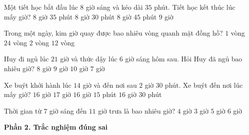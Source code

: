 \begin{ex} %
Một tiết học bắt đầu lúc $8$ giờ sáng và kéo dài $35$ phút. Tiết học kết thúc lúc mấy giờ?
\choice
{\True $8$ giờ $35$ phút}
{$8$ giờ $30$ phút}
{$8$ giờ $45$ phút}
{$9$ giờ}
\end{ex}

\begin{ex} %
Trong một ngày, kim giờ quay được bao nhiêu vòng quanh mặt đồng hồ?
\choice
{$1$ vòng}
{$24$ vòng}
{\True $2$ vòng}
{$12$ vòng}
\end{ex}

\begin{ex} %
Huy đi ngủ lúc $21$ giờ và thức dậy lúc $6$ giờ sáng hôm sau. Hỏi Huy đã ngủ bao nhiêu giờ?
\choice
{$8$ giờ}
{\True $9$ giờ}
{$10$ giờ}
{$7$ giờ}
\end{ex}

\begin{ex} %
Xe buýt khởi hành lúc $14$ giờ và đến nơi sau $2$ giờ $30$ phút. Xe buýt đến nơi lúc mấy giờ?
\choice
{$16$ giờ}
{$17$ giờ}
{$16$ giờ $15$ phút}
{\True $16$ giờ $30$ phút}
\end{ex}

\begin{ex} %
Thời gian từ $7$ giờ sáng đến $11$ giờ trưa là bao nhiêu giờ?
\choice
{\True $4$ giờ}
{$3$ giờ}
{$5$ giờ}
{$6$ giờ}
\end{ex}

\textbf{Phần 2. Trắc nghiệm đúng sai}

